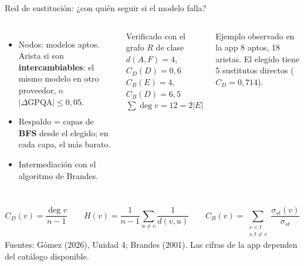 \documentclass[aspectratio=169,11pt]{beamer}
\newcommand{\expone}{}
\begin{document}
\renewcommand{\expone}{Samuel Ramírez}
\begin{frame}{Red de sustitución: ¿con quién seguir si el modelo falla?}
\begin{columns}[T]
\begin{itemize}
  \item Nodos: modelos aptos. Arista si son \textbf{intercambiables}: el mismo modelo en otro proveedor, o $|\Delta\mathrm{GPQA}|\le 0{,}05$.
  \item Respaldo = capas de \textbf{BFS} desde el elegido; en cada capa, el más barato.
  \item Intermediación con el algoritmo de Brandes.
\end{itemize}
\begin{block}{Verificado con el grafo $R$ de clase}
$d(A,F)=4$, \quad $C_D(D)=0{,}6$\\
$C_B(E)=4$, \quad $C_B(D)=6{,}5$\\
$\sum\deg v = 12 = 2|E|$
\end{block}
\begin{block}{Ejemplo observado en la app}
8 aptos, 18 aristas. El elegido tiene 5 sustitutos directos ($C_D=0{,}714$).
\end{block}
\end{columns}
\[
C_D(v)=\frac{\deg v}{n-1}\qquad H(v)=\frac{1}{n-1}\sum_{u\ne v}\frac{1}{d(v,u)}\qquad C_B(v)=\sum_{\substack{s<t\\s,t\ne v}}\frac{\sigma_{st}(v)}{\sigma_{st}}
\]
{\tiny\color{gray} Fuentes: Gómez (2026), Unidad 4; Brandes (2001). Las cifras de la app dependen del catálogo disponible.}
\end{frame}
\end{document}

